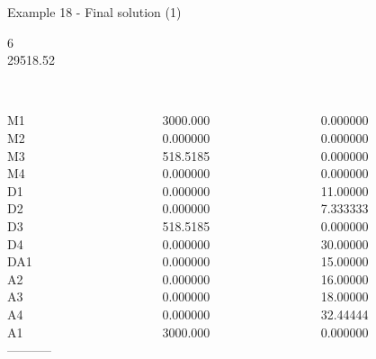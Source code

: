 \begin{frame}{Example 18 - Final solution (1)}

 6 \\
  29518.52\\

\begin{columns}[t]
\begin{column}{0.3\textwidth}
\\
M1\\
M2\\
M3\\
M4\\
D1\\
D2\\
D3\\
D4\\
DA1\\
A2\\
A3\\
A4\\
A1\\
-----------\\

\end{column}
\begin{column}{0.3\textwidth}
\\
3000.000\\
0.000000\\
518.5185\\
0.000000\\
0.000000\\
0.000000\\
518.5185\\
0.000000\\
0.000000\\
0.000000\\
0.000000\\
0.000000\\
3000.000\\
\end{column}

\begin{column}{0.3\textwidth}
\\
0.000000\\
0.000000\\
0.000000\\
0.000000\\
11.00000\\
7.333333\\
0.000000\\
30.00000\\
15.00000\\
16.00000\\
18.00000\\
32.44444\\
0.000000\\
\end{column}
\end{columns}
\end{frame}

